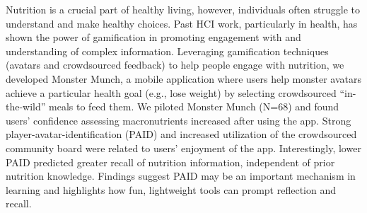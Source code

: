 

Nutrition is a crucial part of healthy living, however, individuals often struggle to understand and make healthy choices. Past HCI work, particularly in health, has shown the power of gamification in promoting engagement with and understanding of complex information. Leveraging gamification techniques (avatars and crowdsourced feedback) to help people engage with nutrition, we developed Monster Munch, a mobile application where users help monster avatars achieve a particular health goal (e.g., lose weight) by selecting crowdsourced ``in-the-wild'' meals to feed them. We piloted Monster Munch (N=68) and found users' confidence assessing macronutrients increased after using the app. Strong player-avatar-identification (PAID) and increased utilization of the crowdsourced community board were related to users' enjoyment of the app. Interestingly, lower PAID predicted greater recall of nutrition information, independent of prior nutrition knowledge. Findings suggest PAID may be an important mechanism in learning and highlights how fun, lightweight tools can prompt reflection and recall.




  
